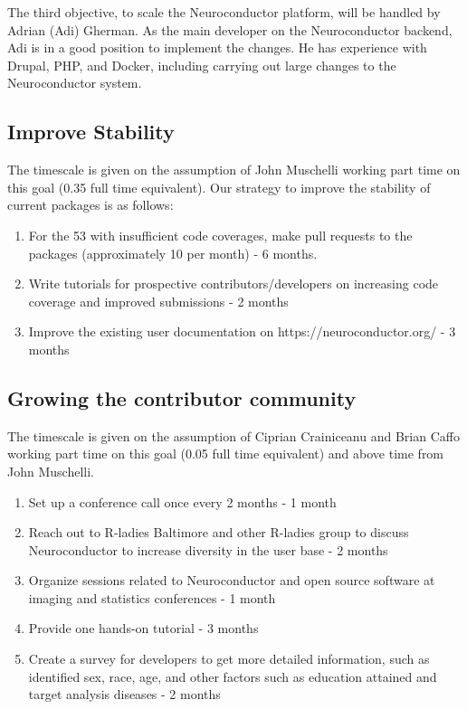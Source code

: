 \documentclass[]{elsarticle} %
\providecommand{\tightlist}{%
  \setlength{\itemsep}{0pt}\setlength{\parskip}{0pt}}
\begin{document}
The third objective, to scale the Neuroconductor platform, will be handled by Adrian (Adi) Gherman. As the main developer on the Neuroconductor backend, Adi is in a good position to implement the changes. He has experience with Drupal, PHP, and Docker, including carrying out large changes to the Neuroconductor system.

\hypertarget{improve-stability}{%
\subsection{Improve Stability}\label{improve-stability}}

The timescale is given on the assumption of John Muschelli working part
time on this goal (0.35 full time equivalent). Our strategy to improve the stability of current packages is as follows:

\begin{enumerate}
\def\labelenumi{\arabic{enumi}.}
\tightlist
\item
  For the 53 with insufficient code coverages, make pull requests to the packages (approximately 10 per month) - 6 months.\\
\item
  Write tutorials for prospective contributors/developers on increasing code coverage and improved submissions - 2 months
\item
  Improve the existing user documentation on https://neuroconductor.org/ - 3 months
\end{enumerate}

\hypertarget{growing-the-contributor-community-1}{%
\subsection{Growing the contributor community}\label{growing-the-contributor-community-1}}

The timescale is given on the assumption of Ciprian Crainiceanu and Brian Caffo working part time on this goal (0.05 full time equivalent) and above time from John Muschelli.

\begin{enumerate}
\def\labelenumi{\arabic{enumi}.}
\tightlist
\item
  Set up a conference call once every 2 months - 1 month
\item
  Reach out to R-ladies Baltimore and other R-ladies group to discuss Neuroconductor to increase diversity in the user base - 2 months
\item
  Organize sessions related to Neuroconductor and open source software at imaging and statistics conferences - 1 month
\item
  Provide one hands-on tutorial - 3 months
\item
  Create a survey for developers to get more detailed information, such as identified sex, race, age, and other factors such as education attained and target analysis diseases - 2 months
\end{enumerate}
\end{document}
